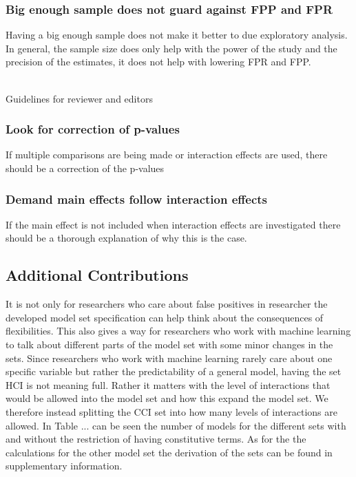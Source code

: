 \subsubsection{Big enough sample does not guard against FPP and FPR}
Having a big enough sample does not make it better to due exploratory analysis. In general, the sample size does only help with the power of the study and the precision of the estimates, it does not help with lowering FPR and FPP. 

\hfill\\
Guidelines for reviewer and editors
\hfill\\
\subsubsection{Look for correction of p-values}
If multiple comparisons are being made or interaction effects are used, there should be a correction of the p-values
\subsubsection{Demand main effects follow interaction effects}
If the main effect is not included when interaction effects are investigated there should be a thorough explanation of why this is the case.

\subsection{Additional Contributions}
It is not only for researchers who care about false positives in researcher the developed model set specification can help think about the consequences of flexibilities. This also gives a way for researchers who work with machine learning to talk about different parts of the model set with some minor changes in the sets. Since researchers who work with machine learning rarely care about one specific variable but rather the predictability of a general model, having the set HCI is not meaning full. Rather it matters with the level of interactions that would be allowed into the model set and how this expand the model set. We therefore instead splitting the CCI set into how many levels of interactions are allowed. In Table ... can be seen the number of models for the different sets with and without the restriction of having constitutive terms. As for the the calculations for the other model set the derivation of the sets can be found in supplementary information. 


 
